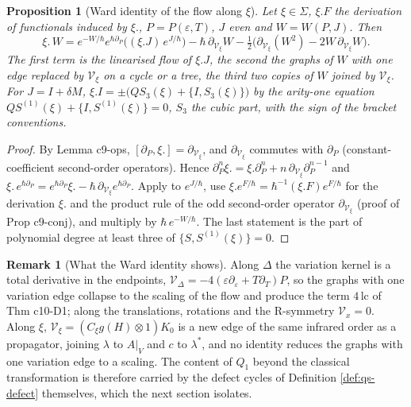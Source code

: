 \documentclass[11pt]{article}
\numberwithin{equation}{section}
\theoremstyle{plain}
\newtheorem{proposition}[theorem]{Proposition}
\theoremstyle{definition}
\newtheorem{remark}[theorem]{Remark}
\begin{document}
\begin{proposition}[Ward identity of the flow along $\xi$]
\label{prop:qs-ward}
Let $\xi\in\Sigma$, $\xi.F$ the derivation of functionals induced by $\xi.$, $P=P(\varepsilon,T)$, $J$ even and $W=W(P,J)$. Then
\begin{equation}
\xi.\,W=e^{-W/\hbar}e^{\hbar\partial_P}\big((\xi.J)\,e^{J/\hbar}\big)-\hbar\,\partial_{\mathcal V_\xi}W-\tfrac12\big(\partial_{\mathcal V_\xi}(W^2)-2W\,\partial_{\mathcal V_\xi}W\big).
\label{eq:qs-ward}
\end{equation}
The first term is the linearised flow of $\xi.J$, the second the graphs of $W$ with one edge replaced by $\mathcal V_\xi$ on a cycle or a tree, the third two copies of $W$ joined by $\mathcal V_\xi$. For $J=I+\delta M$, $\xi.I=\pm\big(QS_3(\xi)+\{I,S_3(\xi)\}\big)$ by the arity-one equation $QS^{(1)}(\xi)+\{I,S^{(1)}(\xi)\}=0$, $S_3$ the cubic part, with the sign of the bracket conventions.
\end{proposition}

\begin{proof}
By Lemma c9-ops, $[\partial_P,\xi.]=\partial_{\mathcal V_\xi}$, and $\partial_{\mathcal V_\xi}$ commutes with $\partial_P$ (constant-coefficient second-order operators). Hence $\partial_P^n\xi.=\xi.\partial_P^n+n\,\partial_{\mathcal V_\xi}\partial_P^{n-1}$ and $\xi.\,e^{\hbar\partial_P}=e^{\hbar\partial_P}\xi.-\hbar\,\partial_{\mathcal V_\xi}e^{\hbar\partial_P}$. Apply to $e^{J/\hbar}$, use $\xi.e^{F/\hbar}=\hbar^{-1}(\xi.F)e^{F/\hbar}$ for the derivation $\xi.$ and the product rule of the odd second-order operator $\partial_{\mathcal V_\xi}$ (proof of Prop c9-conj), and multiply by $\hbar\,e^{-W/\hbar}$. The last statement is the part of polynomial degree at least three of $\{S,S^{(1)}(\xi)\}=0$.
\end{proof}

\begin{remark}[What the Ward identity shows]
\label{rem:qs-ward}
Along $\Delta$ the variation kernel is a total derivative in the endpoints, $\mathcal V_\Delta=-4(\varepsilon\partial_\varepsilon+T\partial_T)P$, so the graphs with one variation edge collapse to the scaling of the flow and produce the term $4\,\mathrm{lc}$ of Thm c10-D1; along the translations, rotations and the R-symmetry $\mathcal V_x=0$. Along $\xi$, $\mathcal V_\xi=(C_\xi g(H)\otimes1)K_0$ is a new edge of the same infrared order as a propagator, joining $\lambda$ to $A|_V$ and $c$ to $\lambda^*$, and no identity reduces the graphs with one variation edge to a scaling. The content of $Q_1$ beyond the classical transformation is therefore carried by the defect cycles of Definition \ref{def:qs-defect} themselves, which the next section isolates.
\end{remark}
\end{document}
